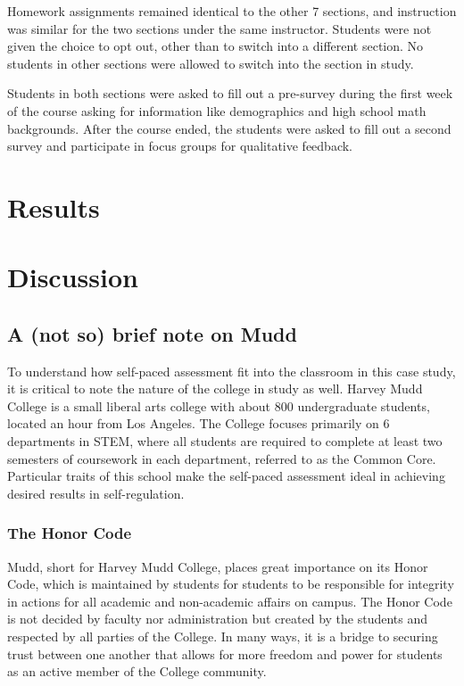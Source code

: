 Homework assignments remained identical to the other 7 sections, and instruction was similar for the two sections under the same instructor. Students were not given the choice to opt out, other than to switch into a different section. No students in other sections were allowed to switch into the section in study.

Students in both sections were asked to fill out a pre-survey during the first week of the course asking for information like demographics and high school math backgrounds. After the course ended, the students were asked to fill out a second survey and participate in focus groups for qualitative feedback.

\section{Results}

\section{Discussion}

\subsection{A (not so) brief note on Mudd}
To understand how self-paced assessment fit into the classroom in this case study, it is critical to note the nature of the college in study as well. Harvey Mudd College is a small liberal arts college with about 800 undergraduate students, located an hour from Los Angeles. The College focuses primarily on 6 departments in STEM, where all students are required to complete at least two semesters of coursework in each department, referred to as the Common Core. Particular traits of this school make the self-paced assessment ideal in achieving desired results in self-regulation.

\subsubsection{The Honor Code}
Mudd, short for Harvey Mudd College, places great importance on its Honor Code, which is maintained by students for students to be responsible for integrity in actions for all academic and non-academic affairs on campus. The Honor Code is not decided by faculty nor administration but created by the students and respected by all parties of the College. In many ways, it is a bridge to securing trust between one another that allows for more freedom and power for students as an active member of the College community.

